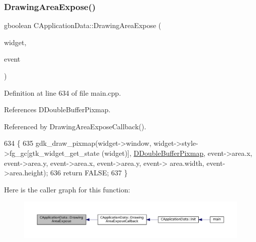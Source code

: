 \subsubsection{\texorpdfstring{Drawing\+Area\+Expose()}{DrawingAreaExpose()}}
{\footnotesize\ttfamily gboolean C\+Application\+Data\+::\+Drawing\+Area\+Expose (\begin{DoxyParamCaption}\item[{Gtk\+Widget $\ast$}]{widget,  }\item[{Gdk\+Event\+Expose $\ast$}]{event }\end{DoxyParamCaption})\hspace{0.3cm}{\ttfamily [protected]}}



Definition at line 634 of file main.\+cpp.



References D\+Double\+Buffer\+Pixmap.



Referenced by Drawing\+Area\+Expose\+Callback().


\begin{DoxyCode}
634                                                                                     \{
635     gdk\_draw\_pixmap(widget->window, widget->style->fg\_gc[gtk\_widget\_get\_state (widget)], 
      \hyperlink{classCApplicationData_aefb64ec5ca3f791f6d431cfc56b9f3b3}{DDoubleBufferPixmap}, event->area.x, event->area.y, event->area.x, event->area.y, event->
      area.width, event->area.height);
636     \textcolor{keywordflow}{return} FALSE;
637 \}
\end{DoxyCode}
Here is the caller graph for this function\+:\nopagebreak
\begin{figure}[H]
\begin{center}
\leavevmode
\includegraphics[width=350pt]{classCApplicationData_ae998e896194920e08f69f321f3bc9500_icgraph}
\end{center}
\end{figure}
\hypertarget{classCApplicationData_af2ec09e61420f6c493d7ef25e4a7bd11}{}\label{classCApplicationData_af2ec09e61420f6c493d7ef25e4a7bd11} 
